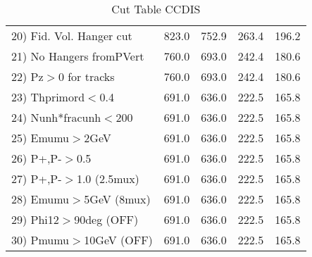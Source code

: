 \begin{table}[h!]
\begin{tabular}{||l||r|r|r|r||}
 20) Fid. Vol. Hanger cut &       823.0 &       752.9 &       263.4 &       196.2 \\
 21) No Hangers fromPVert &       760.0 &       693.0 &       242.4 &       180.6 \\
 22) Pz$>$0 for tracks    &       760.0 &       693.0 &       242.4 &       180.6 \\
 23) Thprimord$<$0.4      &       691.0 &       636.0 &       222.5 &       165.8 \\
 24) Nunh*fracunh$<$200   &       691.0 &       636.0 &       222.5 &       165.8 \\
 25) Emumu$>$2GeV         &       691.0 &       636.0 &       222.5 &       165.8 \\
 26) P+,P-$>$0.5          &       691.0 &       636.0 &       222.5 &       165.8 \\
 27) P+,P-$>$1.0 (2.5mux) &       691.0 &       636.0 &       222.5 &       165.8 \\
 28) Emumu$>$5GeV  (8mux) &       691.0 &       636.0 &       222.5 &       165.8 \\
 29) Phi12$>$90deg  (OFF) &       691.0 &       636.0 &       222.5 &       165.8 \\
 30) Pmumu$>$10GeV  (OFF) &       691.0 &       636.0 &       222.5 &       165.8 \\
 \hline
 \hline
 \end{tabular}
 \caption{Cut Table  CCDIS  }
 \label{tab-cut_ccdis}
 \end{table}
